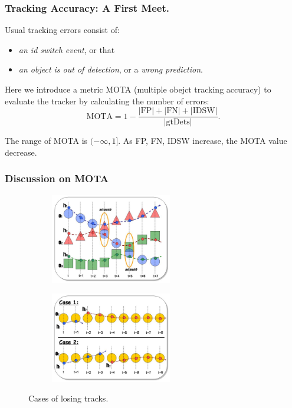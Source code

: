 \documentclass[slidetop, mathserif]{beamer}
\begin{document}
\begin{frame}
	\frametitle{Tracking Accuracy: A First Meet.}

	Usual tracking errors consist of:
	\begin{itemize}
	\item \emph{an id switch event}, or that
	\item \emph{an object is out of detection}, or a \emph{wrong prediction}.
	\end{itemize}

	Here we introduce a metric MOTA (multiple obejct tracking accuracy)
	to evaluate the tracker by calculating the number of errors:
	\[
		\text{MOTA} = 1 - \dfrac{|\text{FP}| + |\text{FN}| + |\text{IDSW}|}{|\text{gtDets}|}.
	\]

	The range of MOTA is $(-\infty,1]$. As FP, FN, IDSW increase, the MOTA value decrease.

\end{frame}

\begin{frame}
	\frametitle{Discussion on MOTA}

	\begin{figure}
		\begin{subfigure}{.49\textwidth}
			\includegraphics[width=150pt]{pics/fig16.png}
		\end{subfigure}
		\begin{subfigure}{.49\textwidth}
			\includegraphics[width=150pt]{pics/fig17.png}
		\end{subfigure}
		\caption{Cases of losing tracks.}
	\end{figure}
\end{frame}
\end{document}
